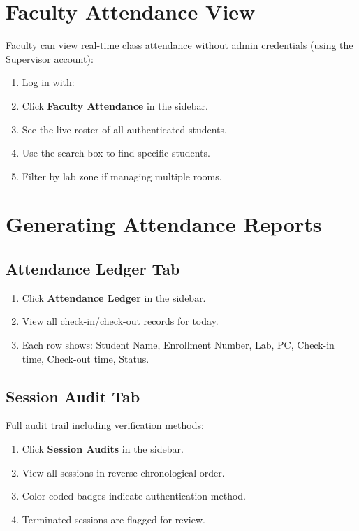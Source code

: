 \section{Faculty Attendance View}

Faculty can view real-time class attendance without admin credentials (using the Supervisor account):

\begin{enumerate}[leftmargin=*, label=\textbf{\arabic*.}]
  \item Log in with: 
  \item Click \textbf{Faculty Attendance} in the sidebar.
  \item See the live roster of all authenticated students.
  \item Use the search box to find specific students.
  \item Filter by lab zone if managing multiple rooms.
\end{enumerate}

\section{Generating Attendance Reports}

\subsection{Attendance Ledger Tab}

\begin{enumerate}[leftmargin=*, label=\textbf{\arabic*.}]
  \item Click \textbf{Attendance Ledger} in the sidebar.
  \item View all check-in/check-out records for today.
  \item Each row shows: Student Name, Enrollment Number, Lab, PC, Check-in time, Check-out time, Status.
\end{enumerate}

\subsection{Session Audit Tab}

Full audit trail including verification methods:
\begin{enumerate}[leftmargin=*, label=\textbf{\arabic*.}]
  \item Click \textbf{Session Audits} in the sidebar.
  \item View all sessions in reverse chronological order.
  \item Color-coded badges indicate authentication method.
  \item Terminated sessions are flagged for review.
\end{enumerate}

